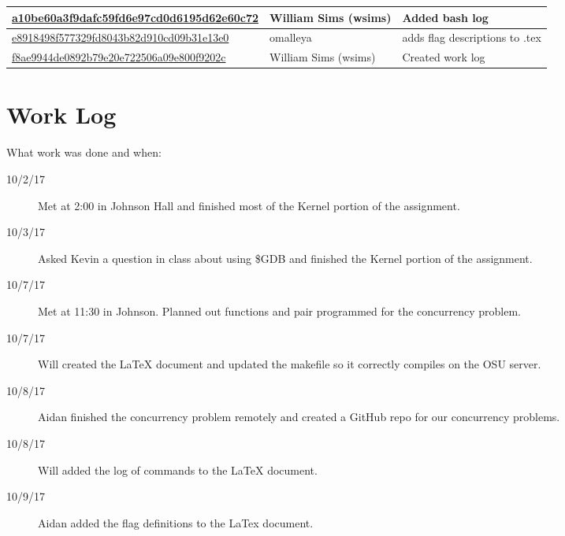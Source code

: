 \documentclass[10pt,letterpaper,draftclsnofoot,onecolumn]{IEEEtran}
\begin{document}
\begin{center}
\begin{tabular}{ | l | l | l |}
    \href{https://github.com/omalleya/cs444-concurrency-writeups/commit/a10be60a3f9dafc59fd6e97cd0d6195d62e60c72}{a10be60a3f9dafc59fd6e97cd0d6195d62e60c72} & William Sims (wsims) & Added bash log \\ \hline
    \href{https://github.com/omalleya/cs444-concurrency-writeups/commit/e8918498f577329fd8043b82d910cd09b31e13e0}{e8918498f577329fd8043b82d910cd09b31e13e0} & omalleya & adds flag descriptions to .tex \\ \hline
    \href{https://github.com/omalleya/cs444-concurrency-writeups/commit/f8ae9944de0892b79e20e722506a09e800f9202c}{f8ae9944de0892b79e20e722506a09e800f9202c} & William Sims (wsims) & Created work log \\ \hline
    \end{tabular}
\end{center}

\section{Work Log}
\noindent What work was done and when:
\begin{description}
\item [10/2/17] Met at 2:00 in Johnson Hall and finished most of the Kernel portion of the assignment.
\item [10/3/17] Asked Kevin a question in class about using \$GDB and finished the Kernel portion of the assignment. 
\item [10/7/17] Met at 11:30 in Johnson. Planned out functions and pair programmed for the concurrency problem.
\item [10/7/17] Will created the LaTeX document and updated the makefile so it correctly compiles on the OSU server. 
\item [10/8/17] Aidan finished the concurrency problem remotely and created a GitHub repo for our concurrency problems. 
\item [10/8/17] Will added the log of commands to the LaTeX document. 
\item [10/9/17] Aidan added the flag definitions to the LaTex document. 
\end{description}
\end{document}
